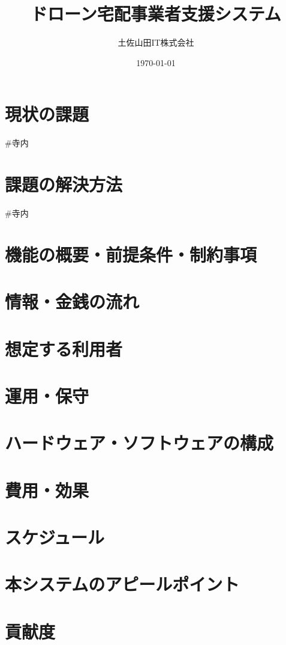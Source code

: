 \documentclass[a4paper, titlepage]{jsarticle}
\date{\today}
\title{ドローン宅配事業者支援システム}
\author{土佐山田IT株式会社}
\begin{document}
\maketitle

\tableofcontents

\clearpage

\section{現状の課題}
#寺内
\section{課題の解決方法}
#寺内
\section{機能の概要・前提条件・制約事項}

\section{情報・金銭の流れ}

\section{想定する利用者}

\section{運用・保守}

\section{ハードウェア・ソフトウェアの構成}

\section{費用・効果}

\section{スケジュール}

\section{本システムのアピールポイント}

\section{貢献度}
\end{document}
